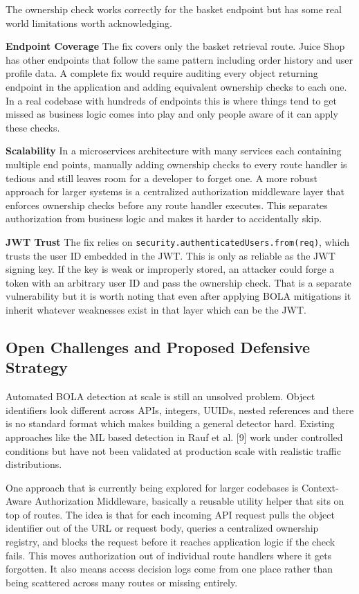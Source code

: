 \documentclass[12pt]{IEEEtran}
\begin{document}
The ownership check works correctly for the basket endpoint but has some real world limitations worth acknowledging.

\textbf{Endpoint Coverage} The fix covers only the basket retrieval route. Juice Shop has other endpoints that follow the same pattern including order history and user profile data. A complete fix would require auditing every object returning endpoint in the application and adding equivalent ownership checks to each one. In a real codebase with hundreds of endpoints this is where things tend to get missed as business logic comes into play and only people aware of it can apply these checks.

\textbf{Scalability} In a microservices architecture with many services each containing multiple end points, manually adding ownership checks to every route handler is tedious and still leaves room for a developer to forget one. A more robust approach for larger systems is a centralized authorization middleware layer that enforces ownership checks before any route handler executes. This separates authorization from business logic and makes it harder to accidentally skip.

\textbf{JWT Trust} The fix relies on \texttt{security.authenticatedUsers.from(req)}, which trusts the user ID embedded in the JWT. This is only as reliable as the JWT signing key. If the key is weak or improperly stored, an attacker could forge a token with an arbitrary user ID and pass the ownership check. That is a separate vulnerability but it is worth noting that even after applying BOLA mitigations it inherit whatever weaknesses exist in that layer which can be the JWT.

\subsection{Open Challenges and Proposed Defensive Strategy}

Automated BOLA detection at scale is still an unsolved problem. Object identifiers look different across APIs, integers, UUIDs, nested references and there is no standard format which makes building a general detector hard. Existing approaches like the ML based detection in Rauf et al. [9] work under controlled conditions but have not been validated at production scale with realistic traffic distributions.

One approach that is currently being explored for larger codebases is  Context-Aware Authorization Middleware, basically a reusable utility helper that sits on top of routes. The idea is that for each incoming API request pulls the object identifier out of the URL or request body, queries a centralized ownership registry, and blocks the request before it reaches application logic if the check fails. This moves authorization out of individual route handlers where it gets forgotten. It also means access decision logs come from one place rather than being scattered across many routes or missing entirely.
\end{document}

